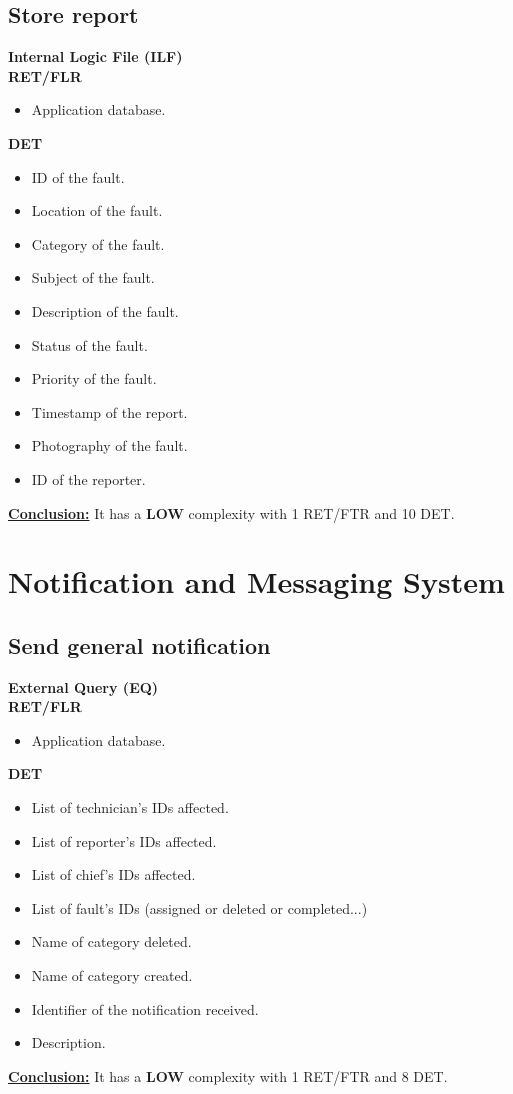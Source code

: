 \subsection{Store report}
\textbf{Internal Logic File (ILF)} \\ 
\textbf{RET/FLR}
\begin{itemize}
\item Application database.
\end{itemize}
\textbf{DET}
\begin{itemize}
\item ID of the fault.
\item Location of the fault.
\item Category of the fault.
\item Subject of the fault.
\item Description of the fault.
\item Status of the fault.
\item Priority of the fault.
\item Timestamp of the report.
\item Photography of the fault.
\item ID of the reporter.
\end{itemize}
\textbf{\underline{Conclusion:}} It has a \textbf{LOW} complexity with 1 RET/FTR and 10 DET.


\section{Notification and Messaging System}

\subsection{Send general notification}
\textbf{External Query (EQ)} \\ 
\textbf{RET/FLR}
\begin{itemize}
\item Application database.
\end{itemize}
\textbf{DET}
\begin{itemize}
\item List of technician's IDs affected.
\item List of reporter's IDs affected.
\item List of chief's IDs affected.
\item List of fault's IDs (assigned or deleted or completed...)
\item Name of category deleted.
\item Name of category created.
\item Identifier of the notification received.
\item Description.
\end{itemize}
\textbf{\underline{Conclusion:}} It has a \textbf{LOW} complexity with 1 RET/FTR and 8 DET.


